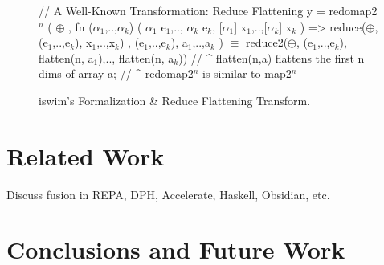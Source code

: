 \documentclass{sigplanconf}  %
\newcommand{\emp}[1]{\textcolor{DikuRed}{ #1}}
\newcommand{\emphh}[1]{\textcolor{CosGreen}{ #1}}
\newcommand{\mymath}[1]{$ #1 $}
\newcommand{\myindx}[1]{_{#1}}
\newcommand{\myindu}[1]{^{#1}}
\begin{document}
\begin{figure}[bt]
{\begin{colorcode}
// \emp{A Well-Known Transformation: Reduce Flattening}
y = redomap2\mymath{\myindu{n}} ( \mymath{\oplus} 
               , fn (\mymath{\alpha\myindx{1}},..,\mymath{\alpha\myindx{k}}) ( \mymath{\alpha\myindx{1}} e\mymath{\myindx{1}},..,  \mymath{\alpha\myindx{k}} e\mymath{\myindx{k}},
                                [\mymath{\alpha\myindx{1}}] x\mymath{\myindx{1}},..,[\mymath{\alpha\myindx{k}}] x\mymath{\myindx{k}} ) => 
                     reduce(\mymath{\oplus}, (e\mymath{\myindx{1}},..,e\mymath{\myindx{k}}), x\mymath{\myindx{1}},..,x\mymath{\myindx{k}})
               , (e\mymath{\myindx{1}},..,e\mymath{\myindx{k}}), a\mymath{\myindx{1}},..,a\mymath{\myindx{k}} )
        \emphh{\mymath{\equiv}}
reduce2(\mymath{\oplus}, (e\mymath{\myindx{1}},..,e\mymath{\myindx{k}}), flatten(n, a\mymath{\myindx{1}}),.., flatten(n, a\mymath{\myindx{k}}))
// ^ flatten(n,a) flattens the first n dims of array a;
// ^ redomap2\mymath{\myindu{n}} is similar to map2\mymath{\myindu{n}}
\end{colorcode}
} \vspace{-2ex}
\caption{{\sc iswim}'s Formalization \& Reduce Flattening Transform.}
\label{fig:TransfGen}
\end{figure}




\section{Related Work}
\label{sec:RelWork}

Discuss fusion in REPA, DPH, Accelerate, Haskell, Obsidian, etc.

\section{Conclusions and Future Work}
\label{sec:Concl}




%
\end{document}
